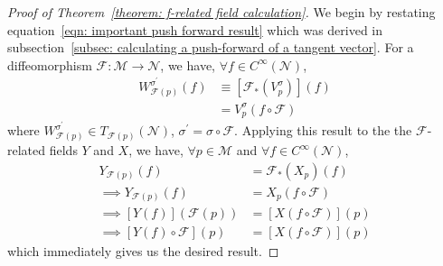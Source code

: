       \begin{proof}[Proof of Theorem~\ref{theorem: f-related field
      calculation}]
        We begin by restating equation~\ref{eqn: important push forward
        result} which was derived in subsection~\ref{subsec:
        calculating a push-forward of a tangent vector}. For a
        diffeomorphism $\mathcal{F}:\mathcal{M} \rightarrow
        \mathcal{N}$, we have, $\forall f \in C^\infty(\mathcal{N})$,
        \begin{align*}
          W^{\sigma^\prime}_{\mathcal{F}(p)}(f) &\equiv
          [\mathcal{F}_{*}\left(V^\sigma_p\right)](f) \\
          &= V^\sigma_p(f \circ \mathcal{F})
        \end{align*}
        where $W^{\sigma^\prime}_{\mathcal{F}(p)} \in
        T_{\mathcal{F}(p)}(\mathcal{N})$, $\sigma^\prime = \sigma \circ
        \mathcal{F}$. Applying this result to the the
        $\mathcal{F}$-related fields $Y$ and $X$, we have, $\forall p
        \in \mathcal{M}$ and $\forall f \in C^\infty(\mathcal{N})$,
        \begin{align*}
          Y_{\mathcal{F}(p)}(f) &= \mathcal{F}_{*}(X_p)(f) \\
          \implies Y_{\mathcal{F}(p)}(f) &= X_p(f \circ \mathcal{F}) \\
          \implies [Y(f)](\mathcal{F}(p)) &= [X(f\circ \mathcal{F})](p) \\
          \implies [Y(f) \circ \mathcal{F}](p) &= [X(f\circ \mathcal{F})](p)
        \end{align*}
        which immediately gives us the desired result.
      \end{proof}
